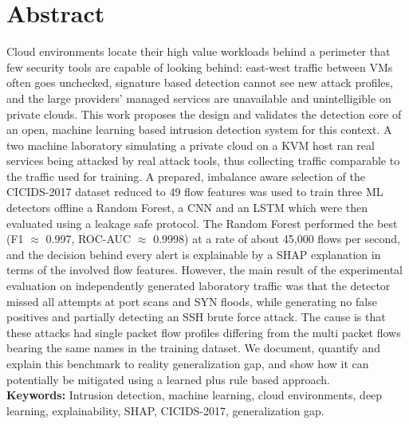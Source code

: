 \documentclass[12pt, a4paper, oneside]{report}
\begin{document}
\newpage

\chapter*{Abstract}
\noindent

Cloud environments locate their high value workloads behind a perimeter that few security tools are capable of looking behind: east-west traffic between VMs often goes unchecked, signature based detection cannot see new attack profiles, and the large providers' managed services are unavailable and unintelligible on private clouds. This work proposes the design and validates the detection core of an open, machine learning based intrusion detection system for this context. A two machine laboratory simulating a private cloud on a KVM host ran real services being attacked by real attack tools, thus collecting traffic comparable to the traffic used for training. A prepared, imbalance aware selection of the CICIDS-2017 dataset reduced to 49 flow features was used to train three ML detectors offline  a Random Forest, a CNN and an LSTM  which were then evaluated using a leakage safe protocol. The Random Forest performed the best (F1 $\approx$ 0.997, ROC-AUC $\approx$ 0.9998) at a rate of about 45{,}000 flows per second, and the decision behind every alert is explainable by a SHAP explanation in terms of the involved flow features. However, the main result of the experimental evaluation on independently generated laboratory traffic was that the detector missed all attempts at port scans and SYN floods, while generating no false positives and partially detecting an SSH brute force attack. The cause is that these attacks had single packet flow profiles differing from the multi packet flows bearing the same names in the training dataset. We document, quantify and explain this benchmark to reality generalization gap, and show how it can potentially be mitigated using a learned plus rule based approach.\\[1em]

\noindent\textbf{Keywords:} Intrusion detection, machine learning, cloud environments, deep learning, explainability, SHAP, CICIDS-2017, generalization gap.

\newpage

\tableofcontents
\newpage
\listoffigures
{}
\newpage
\listoftables
{}
\newpage
\end{document}
